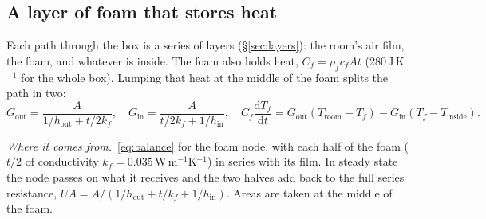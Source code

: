 \documentclass[11pt,a4paper]{article}
\newcommand{\where}{\par\noindent\textit{Where it comes from.}\ }
\begin{document}
\subsection{A layer of foam that stores heat}
Each path through the box is a series of layers (§\ref{sec:layers}): the room's air film, the foam,
and whatever is inside. The foam also holds heat, $C_f = \rho_f c_f A t$ (280\,J\,K$^{-1}$ for the whole
box). Lumping that heat at the middle of the foam splits the path in two:
\begin{equation}
G_{\text{out}} = \frac{A}{1/h_{\text{out}} + t/2k_f},\quad
G_{\text{in}} = \frac{A}{t/2k_f + 1/h_{\text{in}}},\quad
C_f\frac{\mathrm dT_f}{\mathrm dt} = G_{\text{out}}(T_{\text{room}} - T_f) - G_{\text{in}}(T_f - T_{\text{inside}}).
\label{eq:foam}
\end{equation}
\where \eqref{eq:balance} for the foam node, with each half of the foam ($t/2$ of conductivity
$k_f = 0.035$\,W\,m$^{-1}$K$^{-1}$) in series with its film. In steady state the node passes on what it
receives and the two halves add back to the full series resistance, $UA = A/(1/h_{\text{out}} + t/k_f +
1/h_{\text{in}})$. Areas are taken at the middle of the foam.
\end{document}

